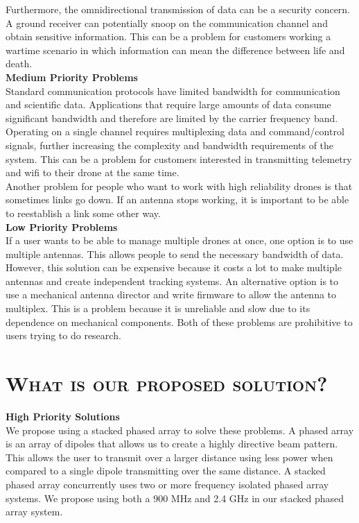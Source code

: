 \documentclass[11pt]{article}
\numberwithin{figure}{section}
\begin{document}
	Furthermore, the omnidirectional transmission of data can be a security concern.  A ground receiver can potentially snoop on the communication channel and obtain sensitive information. This can be a problem for customers working a wartime scenario in which information can mean the difference between life and death.  \\

	\textbf{Medium Priority Problems} \\
	Standard communication protocols have limited bandwidth for communication and scientific data.  Applications that require large amounts of data consume significant bandwidth and therefore are limited by the carrier frequency band.  Operating on a single channel requires multiplexing data and command/control signals, further increasing the complexity and bandwidth requirements of the system. This can be a problem for customers interested in transmitting telemetry and wifi to their drone at the same time. \\
	
	Another problem for people who want to work with high reliability drones is that sometimes links go down. If an antenna stops working, it is important to be able to reestablish a link some other way. \\
	
	\textbf{Low Priority Problems} \\
	If a user wants to be able to manage multiple drones at once, one option is to use multiple antennas. This allows people to send the necessary bandwidth of data. However, this solution can be expensive because it costs a lot to make multiple antennas and create independent tracking systems. An alternative option is to use a mechanical antenna director and write firmware to allow the antenna to multiplex. This is a problem because it is unreliable and slow due to its dependence on mechanical components. Both of these problems are prohibitive to users trying to do research.
	

	
\section{\textsc{What is our proposed solution?}}
	\textbf{High Priority Solutions}  \\
	We propose using a stacked phased array to solve these problems.  A phased array is an array of dipoles that allows us to create a highly directive beam pattern.  This allows the user to transmit over a larger distance using less power when compared to a single dipole transmitting over the same distance.  A stacked phased array concurrently uses two or more frequency isolated phased array systems.  We propose using both a 900 MHz and 2.4 GHz in our stacked phased array system. \\
	
\end{document}
